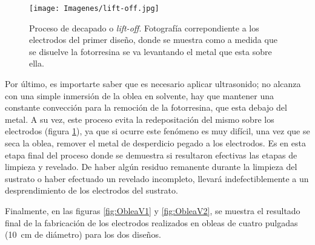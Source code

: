 					  \begin{figure}[ht!]
					  \begin{center}
					  \texttt{[image: Imagenes/lift-off.jpg]}
					  \caption[Proceso de decapado o\textit{ lift-off}]{Proceso de decapado o\textit{ lift-off}. Fotografía correpondiente a los electrodos del primer diseño, donde se muestra como a medida que se disuelve la fotorresina se va levantando el metal que esta sobre ella.}
					  \label{fig:ultrasonido}
					  \end{center}
					  \end{figure}

		 Por último, es importarte saber que es necesario aplicar ultrasonido; no alcanza con una simple inmersión de la oblea en solvente, hay que mantener una constante convección para la remoción de la fotorresina, que esta debajo del metal. A su vez, este proceso evita la redepositación del mismo sobre los electrodos (figura \ref{fig:ultrasonido}), ya que si ocurre este fenómeno es muy difícil, una vez que se seca la oblea, remover el metal de desperdicio pegado a los electrodos. Es en esta etapa final del proceso donde se demuestra si resultaron efectivas las etapas de limpieza y revelado. De haber algún residuo remanente durante la limpieza del sustrato o haber efectuado un revelado incompleto, llevará indefectiblemente a un desprendimiento de los electrodos del sustrato.

		 Finalmente, en las figuras \ref{fig:ObleaV1} y \ref{fig:ObleaV2}, se muestra el resultado final de la fabricación de los electrodos realizados en obleas de cuatro pulgadas (\SI{10}{\cm} de diámetro) para los dos diseños.

